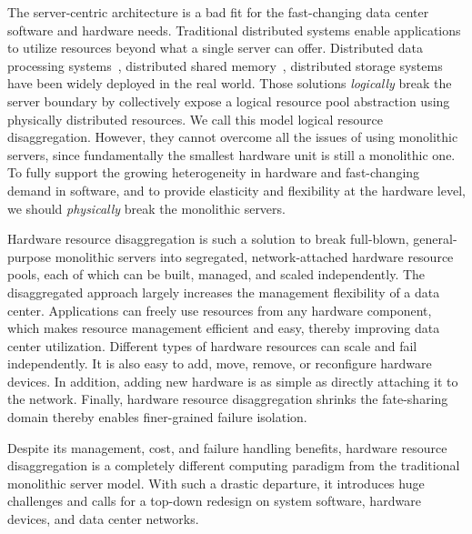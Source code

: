 The server-centric architecture is a bad fit for the fast-changing data center software and hardware needs.
Traditional distributed systems enable applications to utilize resources beyond what a single server can offer. Distributed data processing systems~\cite{Zaharia12-NSDI}, distributed shared memory~\cite{Nelson15-ATC, Li89-ACM}, distributed storage systems~\cite{calder11-azure,DeCandia+07-Dynamo,Ghemawat03-GoogleFS} have been widely deployed in the real world.
%
Those solutions \textit{logically} break the server boundary
by collectively expose a logical resource pool abstraction using physically distributed resources.
We call this model logical resource disaggregation.
However, they cannot overcome all the issues of using monolithic servers,
since fundamentally the smallest hardware unit is still a monolithic one.
%
To fully support the growing heterogeneity in hardware and fast-changing demand in software, and to provide elasticity and flexibility at the hardware level, we should \textit{physically} break the monolithic servers.

Hardware resource disaggregation is such a solution to break full-blown, general-purpose monolithic servers into segregated, network-attached hardware resource pools,
each of which can be built, managed, and scaled independently.
%
The disaggregated approach largely increases the management flexibility of a data center.
Applications can freely use resources from any hardware component, which makes
resource management efficient and easy, thereby improving data center utilization.
Different types of hardware resources can scale and fail independently.
It is also easy to add, move, remove, or reconfigure hardware devices.
In addition, adding new hardware is as simple as directly attaching it to the network.
Finally, hardware resource disaggregation shrinks the fate-sharing domain thereby
enables finer-grained failure isolation.

Despite its management, cost, and failure handling benefits,
hardware resource disaggregation is a completely different
computing paradigm from the traditional monolithic server model.
%
With such a drastic departure,
it introduces huge challenges and calls for a top-down redesign
on system software, hardware devices, and data center networks.

